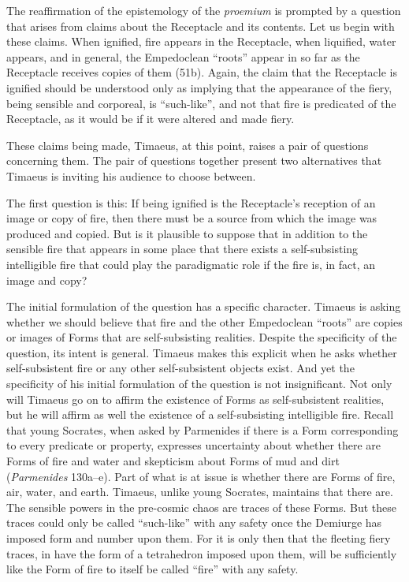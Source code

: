 The reaffirmation of the epistemology of the \emph{proemium} is prompted by a question that arises from claims about the Receptacle and its contents. Let us begin with these claims. When ignified, fire appears in the Receptacle, when liquified, water appears, and in general, the Empedoclean ``roots'' appear in so far as the Receptacle receives copies of them (51b). Again, the claim that the Receptacle is ignified should be understood only as implying that the appearance of the fiery, being sensible and corporeal, is ``such-like'', and not that fire is predicated of the Receptacle, as it would be if it were altered and made fiery.

These claims being made, Timaeus, at this point, raises a pair of questions concerning them. The pair of questions together present two alternatives that Timaeus is inviting his audience to choose between. 

The first question is this: If being ignified is the Receptacle's reception of an image or copy of fire, then there must be a source from which the image was produced and copied. But is it plausible to suppose that in addition to the sensible fire that appears in some place that there exists a self-subsisting intelligible fire that could play the paradigmatic role if the fire is, in fact, an image and copy? 


The initial formulation of the question has a specific character. Timaeus is asking whether we should believe that fire and the other Empedoclean ``roots'' are copies or images of Forms that are self-subsisting realities. Despite the specificity of the question, its intent is general. Timaeus makes this explicit when he asks whether self-subsistent fire or any other self-subsistent objects exist. And yet the specificity of his initial formulation of the question is not insignificant. Not only will Timaeus go on to affirm the existence of Forms as self-subsistent realities, but he will affirm as well the existence of a self-subsisting intelligible fire. Recall that young Socrates, when asked by Parmenides if there is a Form corresponding to every predicate or property, expresses uncertainty about whether there are Forms of fire and water and skepticism about Forms of mud and dirt (\emph{Parmenides} 130a--e). Part of what is at issue is whether there are Forms of fire, air, water, and earth. Timaeus, unlike young Socrates, maintains that there are. The sensible powers in the pre-cosmic chaos are traces of these Forms. But these traces could only be called ``such-like'' with any safety once the Demiurge has imposed form and number upon them. For it is only then that the fleeting fiery traces, in have the form of a tetrahedron imposed upon them, will be sufficiently like the Form of fire to itself be called ``fire'' with any safety.

